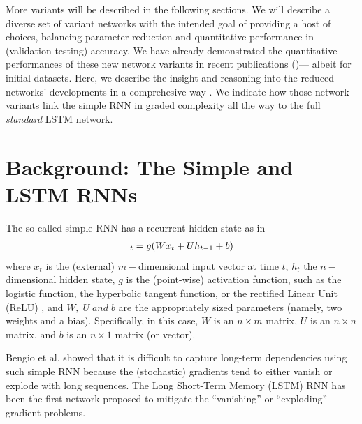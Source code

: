 \documentclass{article}
\begin{document}
More variants will be described in the following sections.  We will describe a diverse set of variant networks with the intended goal of providing a host of choices, balancing parameter-reduction and quantitative performance in (validation-testing) accuracy. We have already demonstrated the quantitative performances of these new network variants in recent publications (\cite {LuSalem2017, HeckSalem2017, DeySalem2017, AkandehSalem2017I, AkandehSalem2017II,  AkandehSalem2017III})--- albeit for initial datasets. Here, we describe the insight and reasoning into the reduced networks' developments in a comprehesive way \cite{salem2016reduced}. We indicate how those network variants link the simple RNN in graded complexity all the way to the full \textit{standard} LSTM network.

\section{Background: The Simple and LSTM RNNs}
The so-called simple RNN has a recurrent hidden state as in
\begin{align} \label
	h_t = g(Wx_t + Uh_{t-1} + b)
\end{align}
where $x_t$ is the (external)  $m-$dimensional input vector at time $t$, $h_t$ the $n-$dimensional hidden state, $g$ is the (point-wise) activation function, such as the logistic function,  the hyperbolic tangent function, or the rectified Linear Unit (ReLU) \cite{chung2014empirical, zaremba2015empirical}, and $W,\;U\; and\; b$ are the appropriately sized parameters (namely, two weights and a bias). Specifically, in this case,  $W$ is an $n \times m$ matrix,  $U$ is an $n \times n$ matrix, and $b$ is an $n \times 1$ matrix (or vector).

Bengio et al. \cite{bengio1994learning} showed that it is difficult to capture long-term dependencies using such simple RNN because the (stochastic) gradients tend to either vanish or explode with long sequences.  The Long Short-Term Memory (LSTM) RNN \cite{hochreiter1997long, gers2002learning} has been the first network proposed to mitigate the “vanishing” or “exploding” gradient problems.
\end{document}
